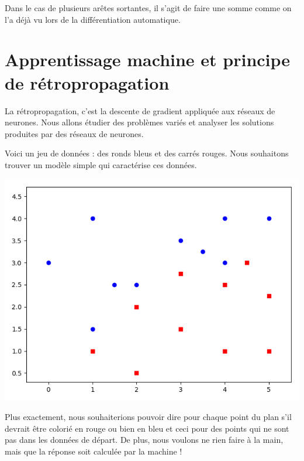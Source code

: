 Dans le cas de plusieurs arêtes sortantes, il s'agit de faire une somme comme on l'a déjà vu lors de la différentiation automatique.






\section{Apprentissage machine et principe de rétropropagation}

La rétropropagation, c'est la descente de gradient appliquée aux réseaux de neurones. Nous allons étudier des problèmes variés et analyser les solutions produites par des réseaux de neurones.

Voici un jeu de données : des ronds bleus et des carrés rouges.
Nous souhaitons trouver un modèle simple qui caractérise ces données.


\begin{center}
	\includegraphics[scale=\myscale,scale=0.5]{figures/retro_01_a}
\end{center}

Plus exactement, nous souhaiterions pouvoir dire pour chaque point du plan s'il devrait être colorié en rouge ou bien en bleu et ceci pour des points qui ne sont pas dans les données de départ. De plus, nous voulons ne rien faire à la main, mais que la réponse soit calculée par la machine !

